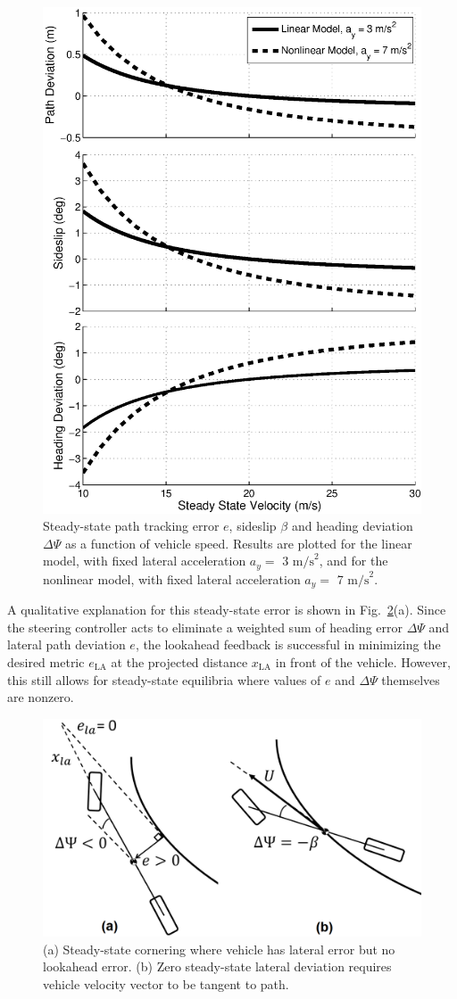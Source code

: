 \documentclass{nVSD2e}
\theoremstyle{plain}
\theoremstyle{definition}
\theoremstyle{remark}
\begin{document}
\begin{figure}[h]
\centering
\includegraphics[width=.7\columnwidth]{figures/LinearErrorPlot.eps}
\caption{Steady-state path tracking error $e$, sideslip $\beta$ and heading deviation $\Delta\Psi$ as a function of vehicle speed. Results are plotted for the linear model, with fixed lateral acceleration $a_y = $ 3 $\mathrm{m/s}^2$, and for the
nonlinear model, with fixed lateral acceleration $a_y = $ 7 $\mathrm{m/s}^2$.}
\label{fig:linError}
\end{figure}
 
A qualitative explanation for this steady-state error is shown in Fig.~\ref{fig:SSerror}(a). Since the steering controller acts to eliminate a weighted
sum of heading error $\Delta\Psi$ and lateral path deviation $e$, the lookahead feedback is successful in
minimizing the desired metric $e_\mathrm{LA}$ at the projected distance $x_\mathrm{LA}$ in front of the vehicle. However, this still allows for steady-state equilibria where
values of $e$ and $\Delta\Psi$ themselves are nonzero.  

\begin{figure}[h]
\centering
\includegraphics[width=0.65\columnwidth]{figures/SSerror.png}
\caption{(a) Steady-state cornering where vehicle has lateral error but no lookahead error. (b) Zero steady-state lateral deviation requires vehicle velocity vector
to be tangent to path.}
\label{fig:SSerror}
\end{figure}
 
\end{document}
